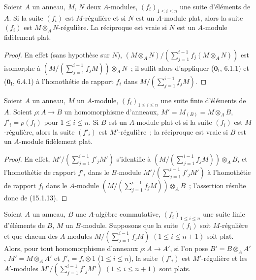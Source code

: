 \begin{proposition}[15.1.13]
\label{0.15.1.13-fr}
Soient $A$ un anneau, $M$, $N$ deux $A$-modules, $(f_i)_{1\leq i\leq n}$ une
suite d'éléments de $A$. Si la suite $(f_i)$ est $M$-régulière et si $N$ est
un $A$-module plat, alors la suite $(f_i)$ est
$M\otimes_A N$-régulière. La réciproque est vraie si $N$ est un $A$-module
fidèlement plat.
\end{proposition}

\begin{proof}
En effet (sans hypothèse sur $N$),
$(M\otimes_A N)/(\sum_{j=1}^{i-1}f_j(M\otimes_A N))$
est isomorphe à
$(M/(\sum_{j=1}^{i-1}f_jM))\otimes_A N$~;
il suffit alors d'appliquer ($\mathbf{0}_{\mathrm I}$, 6.1.1) et
($\mathbf{0}_{\mathrm I}$, 6.4.1) à l'homothétie de rapport $f_i$ dans
$M/(\sum_{j=1}^{i-1}f_jM)$.
\end{proof}

\begin{corollary}[15.1.14]
\label{0.15.1.14-fr}
Soient $A$ un anneau, $M$ un $A$-module, $(f_i)_{1\leq i\leq n}$ une suite
finie d'éléments de $A$. Soient $\rho:A\to B$ un homomorphisme d'anneaux,
$M'=M_{(B)}=M\otimes_A B$, $f'_i=\rho(f_i)$ pour $1\leq i\leq n$. Si $B$ est
un $A$-module plat et si la suite $(f_i)$ est $M$-régulière, alors la suite
$(f'_i)$ est $M'$-régulière~; la réciproque est vraie si $B$ est un
$A$-module fidèlement plat.
\end{corollary}

\begin{proof}
En effet,
$M'/(\sum_{j=1}^{i-1}f'_jM')$
s'identifie à
$(M/(\sum_{j=1}^{i-1}f_jM))\otimes_A B$,
et l'homothétie de rapport $f'_i$ dans le $B$-module
$M'/(\sum_{j=1}^{i-1}f'_jM')$ à l'homothétie de rapport $f_i$ dans le
$A$-module
$(M/(\sum_{j=1}^{i-1}f_jM))\otimes_A B$~;
l'assertion résulte donc de (15.1.13).
\end{proof}

\begin{proposition}[15.1.15]
\label{0.15.1.15-fr}
Soient $A$ un anneau, $B$ une $A$-algèbre commutative,
$(f_i)_{1\leq i\leq n}$ une suite finie d'éléments de $B$, $M$ un
$B$-module. Supposons que la suite $(f_i)$ soit $M$-régulière et que chacun
des $A$-modules
$M/(\sum_{j=1}^{i-1}f_jM)$ $(1\leq i\leq n+1)$
soit plat. Alors, pour tout homomorphisme d'anneaux $\rho:A\to A'$, si l'on
pose $B'=B\otimes_A A'$, $M'=M\otimes_A A'$ et $f'_i=f_i\otimes1$
\textup{($1\leq i\leq n$)}, la suite $(f'_i)$ est $M'$-régulière et les
$A'$-modules
$M'/(\sum_{j=1}^{i-1}f'_jM')$ $(1\leq i\leq n+1)$
sont plats.
\end{proposition}

